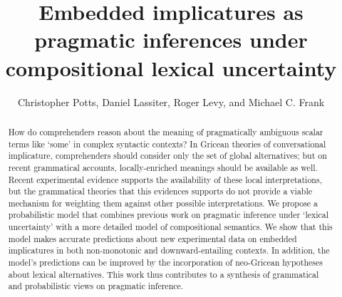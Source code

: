 \documentclass[leqno,12pt]{article}
\begin{document}

\title{Embedded implicatures as pragmatic inferences under compositional lexical uncertainty}
\author{Christopher Potts, Daniel Lassiter, Roger Levy, and Michael
  C. Frank}
\maketitle

\begin{abstract} 
  How do comprehenders reason about the meaning of pragmatically
  ambiguous scalar terms like `some' in complex syntactic contexts?
  In Gricean theories of conversational implicature, 
  comprehenders should consider only the set of global alternatives; but on
  recent grammatical accounts, locally-enriched meanings should be
  available as well. Recent experimental evidence
  supports the availability of these local interpretations, but the grammatical
  theories that this evidences supports do not provide a viable mechanism for
  weighting them against other possible interpretations. We
  propose a probabilistic model that combines previous work on
  pragmatic inference under `lexical uncertainty' with a more detailed
  model of compositional semantics. We show that this model makes
  accurate predictions about new experimental data on embedded
  implicatures in both non-monotonic and downward-entailing
  contexts. In addition, the model's predictions can be improved by
  the incorporation of neo-Gricean hypotheses about lexical
  alternatives. This work thus contributes to a synthesis of grammatical
  and probabilistic views on pragmatic inference. 
\end{abstract}

\end{document}
